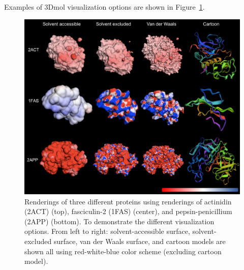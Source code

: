 \documentclass[11pt,titlepage]{article}
\begin{document}
Examples of 3Dmol visualization options are shown in Figure~\ref{fig:features}.
\begin{figure}
	\begin{center}
		\includegraphics[width=.75\paperwidth]{features.png}
		\caption{Renderings of three different proteins using renderings of actinidin (2ACT) (top), fasciculin-2 (1FAS) (center), and pepsin-penicillium (2APP) (bottom).
		To demonstrate the different visualization options.
		From left to right: solvent-accessible surface, solvent-excluded surface, van der Waals  surface, and cartoon models are shown all using red-white-blue color scheme (excluding cartoon model). \label{fig:features}}  
	\end{center}  
\end{figure}
\end{document}
